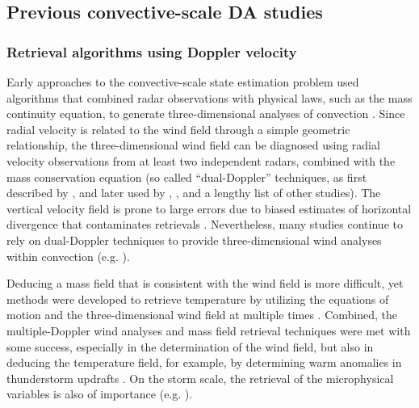 \subsection{Previous convective-scale DA studies}

\subsubsection{Retrieval algorithms using Doppler velocity}
Early approaches to the convective-scale state estimation problem used algorithms that combined radar observations with physical laws, such as the mass continuity equation, to generate three-dimensional analyses of convection \citep{sunetal05}. Since radial velocity is related to the wind field through a simple geometric relationship, the three-dimensional wind field can be diagnosed using radial velocity observations from at least two independent radars, combined with the mass conservation equation (so called “dual-Doppler” techniques, as first described by \citet{armijo69}, and later used by \citet{rayetal75}, \citet{brandes77}, and a lengthy list of other studies). The vertical velocity field is prone to large errors due to biased estimates of horizontal divergence that contaminates retrievals \citep{obrien70,gaoetal99}. Nevertheless, many studies continue to rely on dual-Doppler techniques to provide three-dimensional wind analyses within convection (e.g. \citealt{wurmanetal07,markowskietal08}).

Deducing a mass field that is consistent with the wind field is more difficult, yet methods were developed to retrieve temperature by utilizing the equations of motion and the three-dimensional wind field at multiple times \citep{galchen78, hanescott78, haneetal81, roux85}. Combined, the multiple-Doppler wind analyses and mass field retrieval techniques were met with some success, especially in the determination of the wind field, but also in deducing the temperature field, for example, by determining warm anomalies in thunderstorm updrafts \citep{brandes84}. On the storm scale, the retrieval of the microphysical variables is also of importance (e.g. \citealt{ziegler85,ziegler88}).

